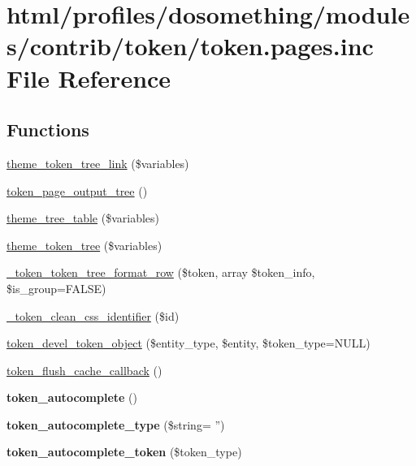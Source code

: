 \hypertarget{token_8pages_8inc}{
\section{html/profiles/dosomething/modules/contrib/token/token.pages.inc File Reference}
\label{token_8pages_8inc}
}
\subsection*{Functions}
\begin{DoxyCompactItemize}
\item 
\hyperlink{token_8pages_8inc_a111e8ee04e4553f7c6bd04732a175435}{theme\_\-token\_\-tree\_\-link} (\$variables)
\item 
\hyperlink{token_8pages_8inc_ac61826267ce539194039a1e0d1b1c85d}{token\_\-page\_\-output\_\-tree} ()
\item 
\hyperlink{token_8pages_8inc_a27af1c0cde4fa8fd2b1ac04f516e2ca6}{theme\_\-tree\_\-table} (\$variables)
\item 
\hyperlink{token_8pages_8inc_a134bf969c587784a30834201a24284e2}{theme\_\-token\_\-tree} (\$variables)
\item 
\hyperlink{token_8pages_8inc_ad7895827dd47b9617320c5a9de747ee7}{\_\-token\_\-token\_\-tree\_\-format\_\-row} (\$token, array \$token\_\-info, \$is\_\-group=FALSE)
\item 
\hyperlink{token_8pages_8inc_ae945ed316363ca5b9c9b56c6554c493c}{\_\-token\_\-clean\_\-css\_\-identifier} (\$id)
\item 
\hyperlink{token_8pages_8inc_a2bdee1bca10e805d74679a6e50c6c7d8}{token\_\-devel\_\-token\_\-object} (\$entity\_\-type, \$entity, \$token\_\-type=NULL)
\item 
\hyperlink{token_8pages_8inc_ad77cea030ce3c4aa50e43d5b93d91908}{token\_\-flush\_\-cache\_\-callback} ()
\item 
\hypertarget{token_8pages_8inc_a2ad4879ecb5e0cdf76baf2a1230635e6}{
{\bfseries token\_\-autocomplete} ()}
\label{token_8pages_8inc_a2ad4879ecb5e0cdf76baf2a1230635e6}

\item 
\hypertarget{token_8pages_8inc_aba64386bdb78d49a36ab22bd146a83f7}{
{\bfseries token\_\-autocomplete\_\-type} (\$string= '')}
\label{token_8pages_8inc_aba64386bdb78d49a36ab22bd146a83f7}

\item 
\hypertarget{token_8pages_8inc_a81eb5e4efc6c1690d6ab4b726bcfd84d}{
{\bfseries token\_\-autocomplete\_\-token} (\$token\_\-type)}
\label{token_8pages_8inc_a81eb5e4efc6c1690d6ab4b726bcfd84d}

\end{DoxyCompactItemize}


